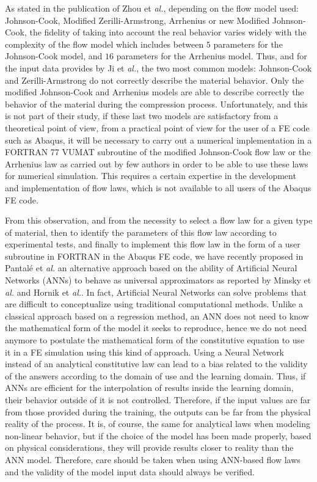 \documentclass[algorithms,article,submit,pdftex,moreauthors]{Definitions/mdpi}
\makeatletter
\DeclareRobustCommand{\eal}{et \emph{al.}\@\xspace}
\makeatother
\begin{document}
As stated in the publication of Zhou \eal \cite{Zhou-2020}, depending on the flow model used: Johnson-Cook, Modified Zerilli-Armstrong, Arrhenius or new Modified Johnson-Cook, the fidelity of taking into account the real behavior varies widely with the complexity of the flow model which includes between $5$ parameters for the Johnson-Cook model, and $16$ parameters for the Arrhenius model.
Thus, and for the input data provides by Ji \eal \cite{Ji-2018}, the two most common models: Johnson-Cook and Zerilli-Armstrong do not correctly describe the material behavior.
Only the modified Johnson-Cook and Arrhenius models are able to describe correctly the behavior of the material during the compression process.
Unfortunately, and this is not part of their study, if these last two models are satisfactory from a theoretical point of view, from a practical point of view for the user of a FE code such as Abaqus, it will be necessary to carry out a numerical implementation in a FORTRAN 77 VUMAT subroutine of the modified Johnson-Cook flow law or the Arrhenius law as carried out by few authors \cite{Liang-2022, Gao-2007-FRT, Ming-2018} in order to be able to use these laws for numerical simulation.
This requires a certain expertise in the development and implementation of flow laws, which is not available to all users of the Abaqus FE code.

From this observation, and from the necessity to select a flow law for a given type of material, then to identify the parameters of this flow law according to experimental tests, and finally to implement this flow law in the form of a user subroutine in FORTRAN in the Abaqus FE code, we have recently proposed in Pantalé \eal \cite{Pantale-2021} an alternative approach based on the ability of Artificial Neural Networks (ANNs) to behave as universal approximators as reported by Minsky \eal \cite{Minsky-1969} and Hornik \eal \cite{Hornik-1989}.
In fact, Artificial Neural Networks can solve problems that are difficult to conceptualize using traditional computational methods.
Unlike a classical approach based on a regression method, an ANN does not need to know the mathematical form of the model it seeks to reproduce, hence we do not need anymore to postulate the mathematical form of the constitutive equation to use it in a FE simulation using this kind of approach.
Using a Neural Network instead of an analytical constitutive law can lead to a bias related to the validity of the answers according to the domain of use and the learning domain. 
Thus, if ANNs are efficient for the interpolation of results inside the learning domain, their behavior outside of it is not controlled. 
Therefore, if the input values are far from those provided during the training, the outputs can be far from the physical reality of the process. 
It is, of course, the same for analytical laws when modeling non-linear behavior, but if the choice of the model has been made properly, based on physical considerations, they will provide results closer to reality than the ANN model. 
Therefore, care should be taken when using ANN-based flow laws and the validity of the model input data should always be verified.
\end{document}

